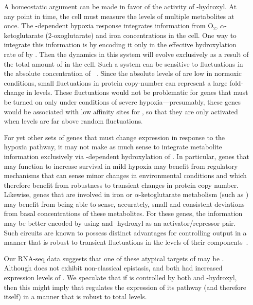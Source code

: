 A homeostatic argument can be made in favor of the activity of \hifp{}-hydroxyl.
At any point in time, the cell must measure the levels of
multiple metabolites at once. The -dependent hypoxia
response integrates information from O$_2$, $\alpha$-ketoglutarate
(2-oxoglutarate) and iron concentrations in the cell. One way to
integrate this information is by encoding it only in the effective hydroxylation
rate of \hifp{} by \eglp{}. Then the dynamics in this system will evolve
exclusively as a result of the total amount of \hifp{} in the cell. Such a system
can be sensitive to fluctuations in the absolute concentration of
\hifp{}~\citep{Goentoro2009a}. Since the absolute levels of \hifp{} are low in
normoxic conditions, small fluctuations in protein copy-number can
represent a large fold-change in \hifp{} levels. These fluctuations would
not be problematic for genes that must be turned on only under conditions of severe
hypoxia---presumably, these genes would be associated with low affinity
sites for \hifp{}, so that they are only activated when \hifp{} levels are far
above random fluctuations.

For yet other sets of genes that must change expression in response to the hypoxia
pathway, it may not make as much sense to integrate metabolite information
exclusively via \eglp{}-dependent hydroxylation of \hifp{}. In particular, genes
that may function to increase survival in mild hypoxia may benefit from regulatory
mechanisms that can sense minor changes in environmental conditions and which
therefore benefit from robustness to transient changes in protein copy number.
Likewise, genes that are involved in iron or $\alpha$-ketoglutarate metabolism
(such as \ftna{}) may benefit from being able to sense, accurately, small and
consistent deviations from basal concentrations of these metabolites. For these
genes, the information may be better encoded by using \hifp{} and
\hifp{}-hydroxyl as an activator/repressor pair. Such circuits are
known to possess distinct advantages for controlling output in a manner that
is robust to transient fluctuations in the levels of their
components~\citep{Hart2012,Hart2013}.

Our RNA-seq data suggests that one of these atypical targets of \hifp{}
may be \rhyp{}. Although  does not exhibit non-classical
epistasis, \hif{} and \eglhif{} both had increased expression levels of .
We speculate that if  is controlled by both \hifp{} and \hifp{}-hydroxyl,
then this might imply that \hifp{} regulates the expression of its pathway (and
therefore itself) in a manner that is robust to total \hifp{} levels.


